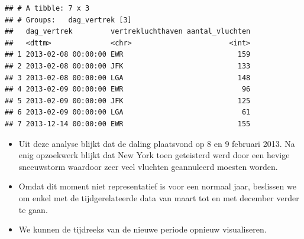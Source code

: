 \documentclass[]{tufte-book}
\newenvironment{Shaded}{}{}
\newcommand{\DataTypeTok}[1]{\textcolor[rgb]{0.56,0.13,0.00}{#1}}
\newcommand{\DecValTok}[1]{\textcolor[rgb]{0.25,0.63,0.44}{#1}}
\newcommand{\KeywordTok}[1]{\textcolor[rgb]{0.00,0.44,0.13}{\textbf{#1}}}
\newcommand{\NormalTok}[1]{#1}
\newcommand{\OperatorTok}[1]{\textcolor[rgb]{0.40,0.40,0.40}{#1}}
\newcommand{\StringTok}[1]{\textcolor[rgb]{0.25,0.44,0.63}{#1}}
\providecommand{\tightlist}{%
  \setlength{\itemsep}{0pt}\setlength{\parskip}{0pt}}
\begin{document}
\begin{verbatim}
## # A tibble: 7 x 3
## # Groups:   dag_vertrek [3]
##   dag_vertrek         vertrekluchthaven aantal_vluchten
##   <dttm>              <chr>                       <int>
## 1 2013-02-08 00:00:00 EWR                           159
## 2 2013-02-08 00:00:00 JFK                           133
## 3 2013-02-08 00:00:00 LGA                           148
## 4 2013-02-09 00:00:00 EWR                            96
## 5 2013-02-09 00:00:00 JFK                           125
## 6 2013-02-09 00:00:00 LGA                            61
## 7 2013-12-14 00:00:00 EWR                           155
\end{verbatim}

\begin{itemize}
\tightlist
\item
  Uit deze analyse blijkt dat de daling plaatsvond op 8 en 9 februari 2013. Na enig opzoekwerk blijkt dat New York toen geteisterd werd door een hevige sneeuwstorm waardoor zeer veel vluchten geannuleerd moesten worden.
\item
  Omdat dit moment niet representatief is voor een normaal jaar, beslissen we om enkel met de tijdgerelateerde data van maart tot en met december verder te gaan.
\end{itemize}

\begin{Shaded}
\end{Shaded}

\begin{itemize}
\tightlist
\item
  We kunnen de tijdreeks van de nieuwe periode opnieuw visualiseren.
\end{itemize}

\begin{Shaded}
\end{Shaded}
\end{document}
